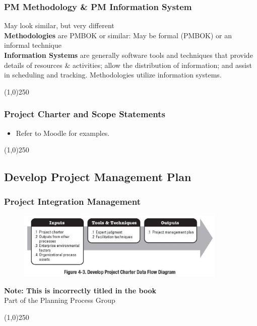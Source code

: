 \begin{frame}
\frametitle{PM Methodology \& PM Information System}
May look similar, but very different\\
\textbf{Methodologies} are PMBOK or similar: May be formal (PMBOK) or an informal technique\\
\textbf{Information Systems} are generally software tools and techniques that provide details of resources \& activities; allow the distribution of information; and assist in scheduling and tracking.  Methodologies utilize information systems.
\end{frame}\begin{center}\line(1,0){250}\end{center}
%
%

\begin{frame}
\frametitle{Project Charter and Scope Statements}

\begin{itemize}
	\item Refer to Moodle for examples.
\end{itemize}
\end{frame}\begin{center}\line(1,0){250}\end{center}
%
%

\subsection{Develop Project Management Plan}


\begin{frame}
\frametitle{Project Integration Management} 
\begin{figure}
 	\centering
 		\includegraphics[width = 10cm]{images/Fig4-3.jpg}
 	\label{fig:4-3}
 \end{figure}
 \textbf{Note: This is incorrectly titled in the book}\\
Part of the Planning Process Group
\end{frame}\begin{center}\line(1,0){250}\end{center}
%
%

